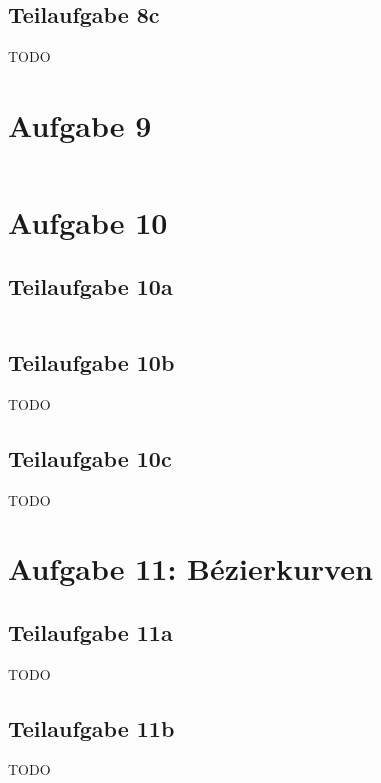 \documentclass[a4paper]{scrartcl}
\begin{document}
\subsection*{Teilaufgabe 8c}
TODO

\section*{Aufgabe 9}
\inputminted[linenos, numbersep=5pt, tabsize=4, frame=lines, label=keyframing.vert]{glsl}{keyframing.vert}

\section*{Aufgabe 10}
\subsection*{Teilaufgabe 10a}
\inputminted[linenos, numbersep=5pt, tabsize=4, frame=lines, label=shader.frag]{glsl}{shader.frag}

\subsection*{Teilaufgabe 10b}
TODO

\subsection*{Teilaufgabe 10c}
TODO

\section*{Aufgabe 11: Bézierkurven}
\subsection*{Teilaufgabe 11a}
TODO
\subsection*{Teilaufgabe 11b}
TODO
\end{document}

